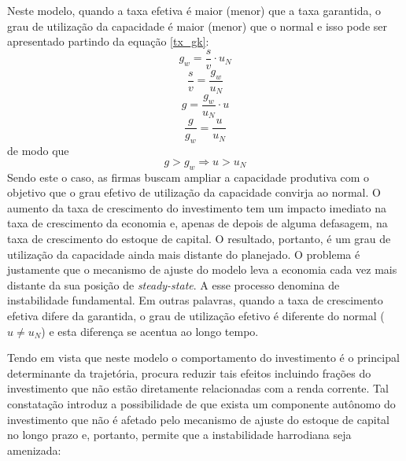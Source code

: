 Neste modelo, quando a taxa efetiva é maior (menor) que a taxa garantida, o grau de utilização da capacidade é maior (menor) que o normal e isso pode ser apresentado partindo da equação \ref{tx_gk}:
$$
g_w = \frac{s}{v}\cdot u_N
$$
$$
\frac{s}{v} = \frac{g_w}{u_N}
$$
$$
g = \frac{g_w}{u_N}\cdot u
$$
$$
\frac{g}{g_w} = \frac{u}{u_N}
$$
de modo que
$$
g > g_w \Rightarrow u > u_N
$$
Sendo este o caso, as firmas buscam ampliar a capacidade produtiva com o objetivo que o grau efetivo de utilização da capacidade convirja ao normal. O aumento da taxa de crescimento do investimento tem um impacto imediato na taxa de crescimento da
economia e, apenas de depois de alguma defasagem, na taxa de crescimento do estoque de capital. O resultado, portanto, é um grau de utilização da capacidade ainda mais distante do planejado. O problema é justamente que o mecanismo de ajuste do modelo leva a economia cada vez mais distante da sua posição de \textit{steady-state}. A esse processo \textcite{harrod_essay_1939} denomina de instabilidade fundamental. Em outras palavras, quando a taxa de crescimento efetiva difere  da garantida, o grau de utilização efetivo é diferente do normal ($u\neq u_N$) e esta diferença se acentua ao longo tempo.






Tendo em vista que neste modelo o comportamento do investimento é o principal determinante da trajetória, \textcite[p.~26--28]{harrod_essay_1939} procura reduzir tais efeitos incluindo frações do investimento que não estão diretamente relacionadas com a renda corrente. Tal constatação introduz a possibilidade de que exista um componente autônomo do investimento que não é afetado pelo mecanismo de ajuste do estoque de capital no longo prazo e, portanto, permite que a instabilidade harrodiana seja amenizada:

